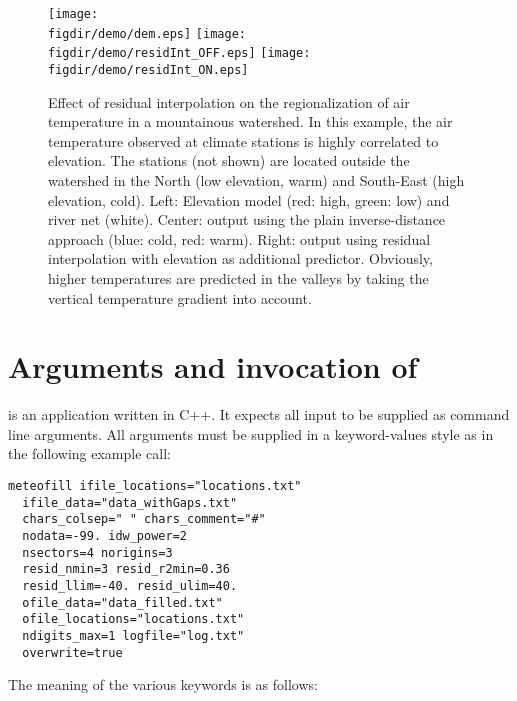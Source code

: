 \begin{figure*}
  \centering
  \texttt{[image: \\figdir/demo/dem.eps]}
  \texttt{[image: \\figdir/demo/residInt\_OFF.eps]}
  \texttt{[image: \\figdir/demo/residInt\_ON.eps]}
  \caption[Example to illustrate the effect of residual interpolation.]{Effect of residual interpolation on the regionalization of air temperature in a mountainous watershed. In this example, the air temperature observed at climate stations is highly correlated to elevation. The stations (not shown) are located outside the watershed in the North (low elevation, warm) and South-East (high elevation, cold). Left: Elevation model (red: high, green: low) and river net (white). Center:  output using the plain inverse-distance approach (blue: cold, red: warm). Right:  output using residual interpolation with elevation as additional predictor. Obviously, higher temperatures are predicted in the valleys by taking the vertical temperature gradient into account. \label{fig:meteofill:resid}}
\end{figure*}

\section{Arguments and invocation of } \label{sec:meteofill:args}

 is an application written in C++. It expects all input to be supplied as command line arguments. All arguments must be supplied in a keyword-values style as in the following example call:

\begin{lstlisting}[style=shell]
meteofill ifile_locations="locations.txt"
  ifile_data="data_withGaps.txt"
  chars_colsep=" " chars_comment="#"
  nodata=-99. idw_power=2
  nsectors=4 norigins=3
  resid_nmin=3 resid_r2min=0.36
  resid_llim=-40. resid_ulim=40.
  ofile_data="data_filled.txt"
  ofile_locations="locations.txt"
  ndigits_max=1 logfile="log.txt"
  overwrite=true
\end{lstlisting}

The meaning of the various keywords is as follows:

